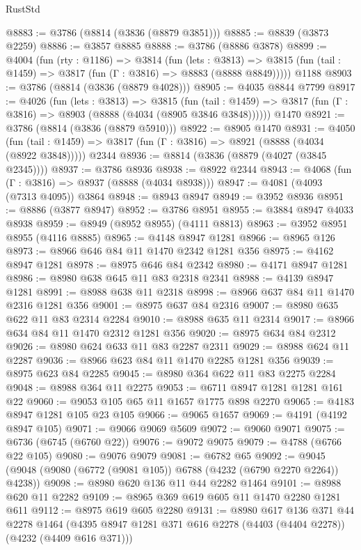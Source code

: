 \begin{lexlean}{RustStd}
\begin{coremodule}
@8883 := @3786 (@8814 (@3836 (@8879 @3851)))
@8885 := @8839 (@3873 @2259)
@8886 := @3857 @8885
@8888 := @3786 (@8886 @3878)
@8899 := @4004
    (fun (rty : @1186) =>
    @3814
      (fun (lets : @3813) =>
      @3815 (fun (tail : @1459) => @3817 (fun (Γ : @3816) => @8883 (@8888 @8849)))))
    @1188
@8903 := @3786 (@8814 (@3836 (@8879 @4028)))
@8905 := @4035 @8844 @7799
@8917 := @4026
    (fun (lets : @3813) =>
    @3815
      (fun (tail : @1459) => @3817 (fun (Γ : @3816) => @8903 (@8888 (@4034 (@8905 @3846 @3848))))))
    @1470
@8921 := @3786 (@8814 (@3836 (@8879 @5910)))
@8922 := @8905 @1470
@8931 := @4050
    (fun (tail : @1459) => @3817 (fun (Γ : @3816) => @8921 (@8888 (@4034 (@8922 @3848)))))
    @2344
@8936 := @8814 (@3836 (@8879 (@4027 (@3845 @2345))))
@8937 := @3786 @8936
@8938 := @8922 @2344
@8943 := @4068 (fun (Γ : @3816) => @8937 (@8888 (@4034 @8938)))
@8947 := @4081 (@4093 (@7313 @4095)) @3864
@8948 := @8943 @8947
@8949 := @3952 @8936
@8951 := @8886 (@3877 @8947)
@8952 := @3786 @8951
@8955 := @3884 @8947 @4033 @8938
@8959 := @8949 (@8952 @8955) (@4111 @8813)
@8963 := @3952 @8951 @8955 (@4116 @8885)
@8965 := @4148 @8947 @1281
@8966 := @8965 @126
@8973 := @8966 @646 @84 @11 @1470 @2342 @1281 @356
@8975 := @4162 @8947 @1281
@8978 := @8975 @646 @84 @2342
@8980 := @4171 @8947 @1281
@8986 := @8980 @638 @645 @11 @83 @2318 @2341
@8988 := @4139 @8947 @1281
@8991 := @8988 @638 @11 @2318
@8998 := @8966 @637 @84 @11 @1470 @2316 @1281 @356
@9001 := @8975 @637 @84 @2316
@9007 := @8980 @635 @622 @11 @83 @2314 @2284
@9010 := @8988 @635 @11 @2314
@9017 := @8966 @634 @84 @11 @1470 @2312 @1281 @356
@9020 := @8975 @634 @84 @2312
@9026 := @8980 @624 @633 @11 @83 @2287 @2311
@9029 := @8988 @624 @11 @2287
@9036 := @8966 @623 @84 @11 @1470 @2285 @1281 @356
@9039 := @8975 @623 @84 @2285
@9045 := @8980 @364 @622 @11 @83 @2275 @2284
@9048 := @8988 @364 @11 @2275
@9053 := @6711 @8947 @1281 @1281 @161 @22
@9060 := @9053 @105 @65 @11 @1657 @1775 @898 @2270
@9065 := @4183 @8947 @1281 @105 @23 @105
@9066 := @9065 @1657
@9069 := @4191 (@4192 @8947 @105)
@9071 := @9066 @9069 @5609
@9072 := @9060 @9071
@9075 := @6736 (@6745 (@6760 @22))
@9076 := @9072 @9075
@9079 := @4788 (@6766 @22 @105)
@9080 := @9076 @9079
@9081 := @6782 @65
@9092 := @9045 (@9048 (@9080 (@6772 (@9081 @105)) @6788 (@4232 (@6790 @2270 @2264)) @4238))
@9098 := @8980 @620 @136 @11 @44 @2282 @1464
@9101 := @8988 @620 @11 @2282
@9109 := @8965 @369 @619 @605 @11 @1470 @2280 @1281 @611
@9112 := @8975 @619 @605 @2280
@9131 := @8980
    @617
    @136
    @371
    @44
    @2278
    @1464
    (@4395 @8947 @1281 @371 @616 @2278 (@4403 (@4404 @2278)) (@4232 (@4409 @616 @371)))

\end{coremodule}
\end{lexlean}
